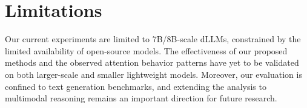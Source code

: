 \section{Limitations}
Our current experiments are limited to 7B/8B-scale dLLMs, constrained by the limited availability of open-source models.
The effectiveness of our proposed methods and the observed attention behavior patterns have yet to be validated on both larger-scale and smaller lightweight models.
Moreover, our evaluation is confined to text generation benchmarks, and extending the analysis to multimodal reasoning remains an important direction for future research.